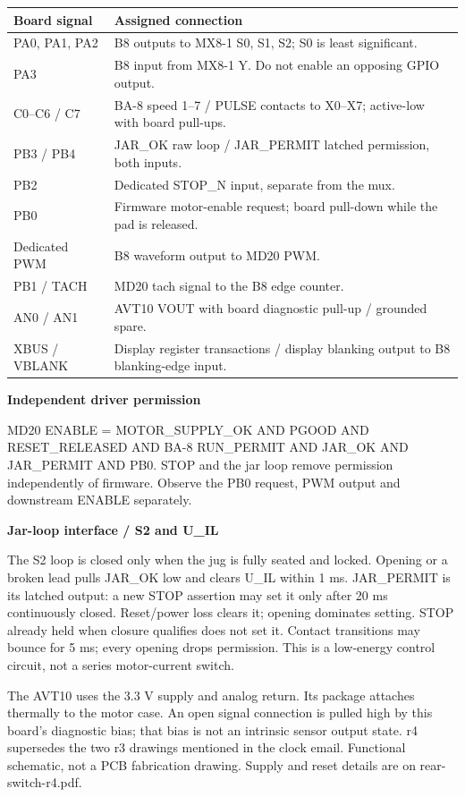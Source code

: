 \begin{tabularx}{\linewidth}{@{}p{.28\linewidth} Y@{}}
\toprule Board signal & Assigned connection\\\midrule
PA0, PA1, PA2 & B8 outputs to MX8-1 S0, S1, S2; S0 is least significant.\\
PA3 & B8 input from MX8-1 Y. Do not enable an opposing GPIO output.\\
C0--C6 / C7 & BA-8 speed 1--7 / PULSE contacts to X0--X7; active-low with board pull-ups.\\
PB3 / PB4 & JAR\_OK raw loop / JAR\_PERMIT latched permission, both inputs.\\
PB2 & Dedicated STOP\_N input, separate from the mux.\\
PB0 & Firmware motor-enable request; board pull-down while the pad is released.\\
Dedicated PWM & B8 waveform output to MD20 PWM.\\
PB1 / TACH & MD20 tach signal to the B8 edge counter.\\
AN0 / AN1 & AVT10 VOUT with board diagnostic pull-up / grounded spare.\\
XBUS / VBLANK & Display register transactions / display blanking output to B8 blanking-edge input.\\\bottomrule
\end{tabularx}

\medskip\textbf{Independent driver permission}\par\small
MD20 ENABLE = MOTOR\_SUPPLY\_OK AND PGOOD AND RESET\_RELEASED AND BA-8 RUN\_PERMIT AND JAR\_OK AND JAR\_PERMIT AND PB0. STOP and the jar loop remove permission independently of firmware. Observe the PB0 request, PWM output and downstream ENABLE separately.
\normalsize\par\medskip
\textbf{Jar-loop interface / S2 and U\_IL}\par
{\small The S2 loop is closed only when the jug is fully seated and locked. Opening or a broken lead pulls JAR\_OK low and clears U\_IL within 1 ms. JAR\_PERMIT is its latched output: a new STOP assertion may set it only after 20 ms continuously closed. Reset/power loss clears it; opening dominates setting. STOP already held when closure qualifies does not set it. Contact transitions may bounce for 5 ms; every opening drops permission. This is a low-energy control circuit, not a series motor-current switch.}\par\medskip

The AVT10 uses the 3.3 V supply and analog return. Its package attaches thermally to the motor case. An open signal connection is pulled high by this board's diagnostic bias; that bias is not an intrinsic sensor output state.
\vfill\small{r4 supersedes the two r3 drawings mentioned in the clock email. Functional schematic, not a PCB fabrication drawing. Supply and reset details are on rear-switch-r4.pdf.}
